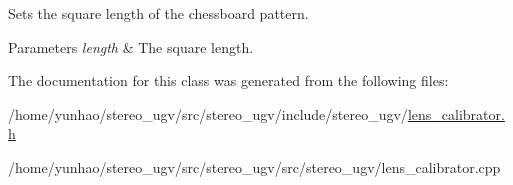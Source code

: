Sets the square length of the chessboard pattern. 


\begin{DoxyParams}{Parameters}
{\em length} & The square length. \\
\hline
\end{DoxyParams}


The documentation for this class was generated from the following files\+:\begin{DoxyCompactItemize}
\item 
/home/yunhao/stereo\+\_\+ugv/src/stereo\+\_\+ugv/include/stereo\+\_\+ugv/\hyperlink{lens__calibrator_8h}{lens\+\_\+calibrator.\+h}\item 
/home/yunhao/stereo\+\_\+ugv/src/stereo\+\_\+ugv/src/stereo\+\_\+ugv/lens\+\_\+calibrator.\+cpp\end{DoxyCompactItemize}
